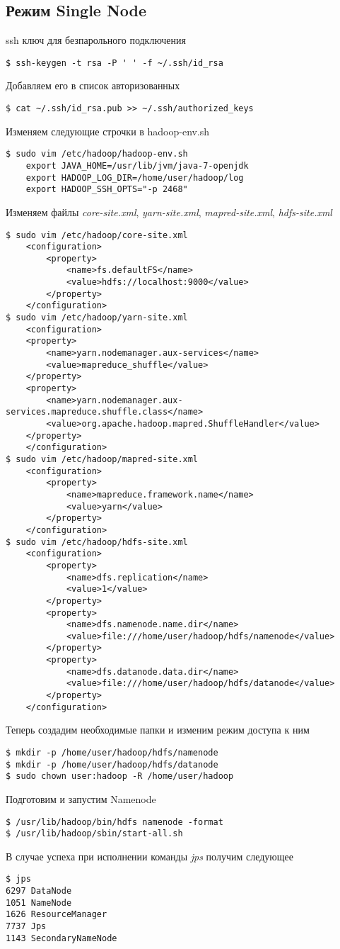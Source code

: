 \subsection{Режим Single Node}
 ssh ключ для безпарольного подключения
\begin{lstlisting}
$ ssh-keygen -t rsa -P ' ' -f ~/.ssh/id_rsa
\end{lstlisting}
Добавляем его в список авторизованных
\begin{lstlisting}
$ cat ~/.ssh/id_rsa.pub >> ~/.ssh/authorized_keys
\end{lstlisting}
Изменяем следующие строчки в hadoop-env.sh
\begin{lstlisting}
$ sudo vim /etc/hadoop/hadoop-env.sh
    export JAVA_HOME=/usr/lib/jvm/java-7-openjdk
    export HADOOP_LOG_DIR=/home/user/hadoop/log
    export HADOOP_SSH_OPTS="-p 2468"
\end{lstlisting}
Изменяем файлы \emph{core-site.xml}, \emph{yarn-site.xml}, \emph{mapred-site.xml}, \emph{hdfs-site.xml}
\begin{lstlisting}
$ sudo vim /etc/hadoop/core-site.xml
    <configuration>
        <property>
            <name>fs.defaultFS</name>
            <value>hdfs://localhost:9000</value>
        </property>
    </configuration>
$ sudo vim /etc/hadoop/yarn-site.xml
    <configuration>
    <property>
        <name>yarn.nodemanager.aux-services</name>
        <value>mapreduce_shuffle</value>
    </property>
    <property>
        <name>yarn.nodemanager.aux-services.mapreduce.shuffle.class</name>
        <value>org.apache.hadoop.mapred.ShuffleHandler</value>
    </property>
    </configuration>
$ sudo vim /etc/hadoop/mapred-site.xml
    <configuration>
        <property>
            <name>mapreduce.framework.name</name>
            <value>yarn</value>
        </property>
    </configuration>
$ sudo vim /etc/hadoop/hdfs-site.xml
    <configuration>
        <property>
            <name>dfs.replication</name>
            <value>1</value>
        </property>
        <property>
            <name>dfs.namenode.name.dir</name>
            <value>file:///home/user/hadoop/hdfs/namenode</value>
        </property>
        <property>
            <name>dfs.datanode.data.dir</name>
            <value>file:///home/user/hadoop/hdfs/datanode</value>
        </property>
    </configuration>
\end{lstlisting}
Теперь создадим необходимые папки и изменим режим доступа к ним
\begin{lstlisting}
$ mkdir -p /home/user/hadoop/hdfs/namenode
$ mkdir -p /home/user/hadoop/hdfs/datanode
$ sudo chown user:hadoop -R /home/user/hadoop
\end{lstlisting}
Подготовим и запустим Namenode
\begin{lstlisting}
$ /usr/lib/hadoop/bin/hdfs namenode -format
$ /usr/lib/hadoop/sbin/start-all.sh
\end{lstlisting}
В случае успеха при исполнении команды \emph{jps} получим следующее
\begin{lstlisting}
$ jps
6297 DataNode
1051 NameNode
1626 ResourceManager
7737 Jps
1143 SecondaryNameNode
\end{lstlisting}

